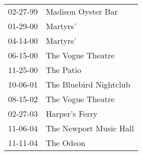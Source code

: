 \begin{supertabular}{p{0.07\textwidth}p{0.23\textwidth}}
 02-27-99 &      Madison Oyster Bar \\
 01-29-00 &                Martyrs' \\
 04-14-00 &                Martyrs' \\
 06-15-00 &       The Vogue Theatre \\
 11-25-00 &               The Patio \\
 10-06-01 &  The Bluebird Nightclub \\
 08-15-02 &       The Vogue Theatre \\
 02-27-03 &          Harper's Ferry \\
 11-06-04 &  The Newport Music Hall \\
 11-11-04 &               The Odeon \\
\end{supertabular}
